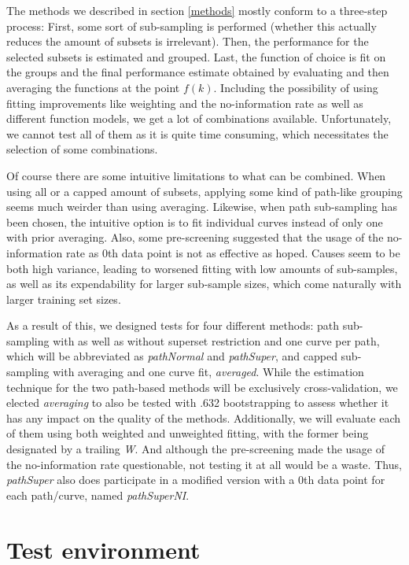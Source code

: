 The methods we described in section \ref{methods} mostly conform to a three-step process: First, some sort of sub-sampling is performed (whether this actually reduces the amount of subsets is irrelevant). Then, the performance for the selected subsets is estimated and grouped. Last, the function of choice is fit on the groups and the final performance estimate obtained by evaluating and then averaging the functions at the point $f(k)$. Including the possibility of using fitting improvements like weighting and the no-information rate as well as different function models, we get a lot of combinations available. Unfortunately, we cannot test all of them as it is quite time consuming, which necessitates the selection of some combinations.

Of course there are some intuitive limitations to what can be combined. When using all or a capped amount of subsets, applying some kind of path-like grouping seems much weirder than using averaging. Likewise, when path sub-sampling has been chosen, the intuitive option is to fit individual curves instead of only one with prior averaging. Also, some pre-screening suggested that the usage of the no-information rate as 0th data point is not as effective as hoped. Causes seem to be both high variance, leading to worsened fitting with low amounts of sub-samples, as well as its expendability for larger sub-sample sizes, which come naturally with larger training set sizes.

As a result of this, we designed tests for four different methods: path sub-sampling with as well as without superset restriction and one curve per path, which will be abbreviated as \textit{pathNormal} and \textit{pathSuper}, and capped sub-sampling with averaging and one curve fit, \textit{averaged}. While the estimation technique for the two path-based methods will be exclusively cross-validation, we elected \textit{averaging} to also be tested with .632 bootstrapping to assess whether it has any impact on the quality of the methods. Additionally, we will evaluate each of them using both weighted and unweighted fitting, with the former being designated by a trailing \textit{W}. And although the pre-screening made the usage of the no-information rate questionable, not testing it at all would be a waste. Thus, \textit{pathSuper} also does participate in a modified version with a 0th data point for each path/curve, named \textit{pathSuperNI}.

\section{Test environment}

